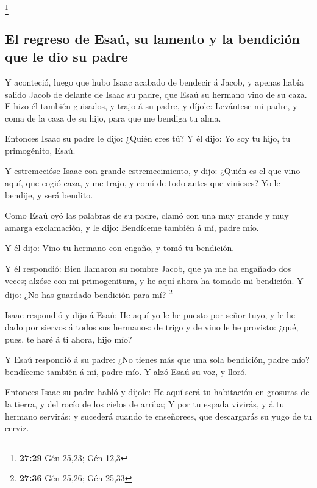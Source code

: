 \footnote{\textbf{27:29} Gén 25,23; Gén 12,3}

\hypertarget{el-regreso-de-esauxfa-su-lamento-y-la-bendiciuxf3n-que-le-dio-su-padre}{%
\subsection{El regreso de Esaú, su lamento y la bendición que le dio su
padre}\label{el-regreso-de-esauxfa-su-lamento-y-la-bendiciuxf3n-que-le-dio-su-padre}}

 Y aconteció, luego que hubo Isaac acabado de bendecir á
Jacob, y apenas había salido Jacob de delante de Isaac su padre, que
Esaú su hermano vino de su caza.  E hizo él también
guisados, y trajo á su padre, y díjole: Levántese mi padre, y coma de la
caza de su hijo, para que me bendiga tu alma.

 Entonces Isaac su padre le dijo: ¿Quién eres tú? Y él
dijo: Yo soy tu hijo, tu primogénito, Esaú.

 Y estremecióse Isaac con grande estremecimiento, y dijo:
¿Quién es el que vino aquí, que cogió caza, y me trajo, y comí de todo
antes que vinieses? Yo le bendije, y será bendito.

 Como Esaú oyó las palabras de su padre, clamó con una
muy grande y muy amarga exclamación, y le dijo: Bendíceme también á mí,
padre mío.

 Y él dijo: Vino tu hermano con engaño, y tomó tu
bendición.

 Y él respondió: Bien llamaron su nombre Jacob, que ya me
ha engañado dos veces; alzóse con mi primogenitura, y he aquí ahora ha
tomado mi bendición. Y dijo: ¿No has guardado bendición para mí?
\footnote{\textbf{27:36} Gén 25,26; Gén 25,33}

 Isaac respondió y dijo á Esaú: He aquí yo le he puesto
por señor tuyo, y le he dado por siervos á todos sus hermanos: de trigo
y de vino le he provisto: ¿qué, pues, te haré á ti ahora, hijo mío?

 Y Esaú respondió á su padre: ¿No tienes más que una sola
bendición, padre mío? bendíceme también á mí, padre mío. Y alzó Esaú su
voz, y lloró.

 Entonces Isaac su padre habló y díjole: He aquí será tu
habitación en grosuras de la tierra, y del rocío de los cielos de
arriba;  Y por tu espada vivirás, y á tu hermano
servirás: y sucederá cuando te enseñorees, que descargarás su yugo de tu
cerviz.

